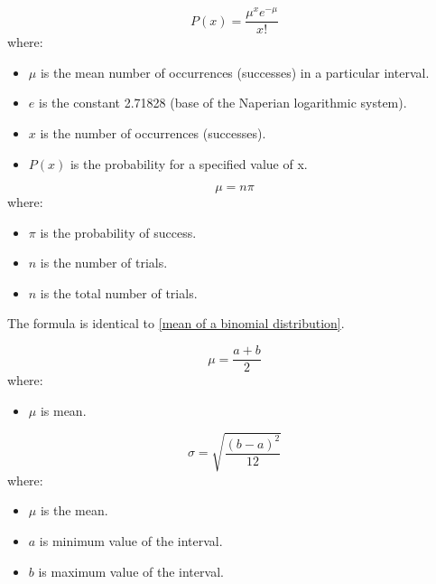 \begin{equation}
\label{poisson distribution}
P(x) = \frac{\mu^{x}e^{-\mu}}{x!}
\end{equation}
where: 
\begin{itemize}
 \item $\mu$ is the mean number of occurrences (successes) in a particular interval.
 \item $e$ is the constant 2.71828 (base of the Naperian logarithmic system).
 \item $x$ is the number of occurrences (successes).
 \item $P(x)$ is the probability for a specified value of x.
\end{itemize}
\hformbar


\begin{equation}
\label{mean of poisson distribution}
\mu = n\pi
\end{equation}
where: 
\begin{itemize}
 \item $\pi$ is the probability of success.
 \item $n$ is the number of trials.
 \item $n$ is the total number of trials.
\end{itemize}
The formula is identical to \eqref{mean of a binomial distribution}.
\hformbar


\begin{equation}
\label{mean of the uniform distribution}
\mu = \frac{a + b}{2}
\end{equation}
where: 
\begin{itemize}
 \item $\mu$ is mean.
\end{itemize}
\hformbar


\begin{equation}
\label{standard deviation of the uniform distribution}
\sigma = \sqrt{\frac{(b - a)^2}{12}}
\end{equation}
where: 
\begin{itemize}
 \item $\mu$ is the mean.
 \item $a$ is minimum value of the interval.
 \item $b$ is maximum value of the interval.
\end{itemize}
\hformbar


